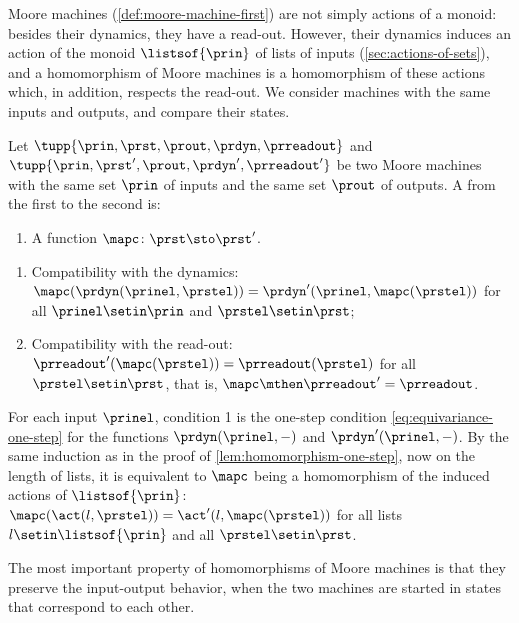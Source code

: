 Moore machines (\cref{def:moore-machine-first}) are not simply actions of a monoid: besides their dynamics, they have a read-out.
However, their dynamics induces an action of the monoid $\listsof{\prin}$ of lists of inputs (\cref{sec:actions-of-sets}), and a homomorphism of Moore machines is a homomorphism of these actions which, in addition, respects the read-out.
We consider machines with the same inputs and outputs, and compare their states.

\begin{ctdefinition}
    \label{def:moore-machine-homomorphism}
    Let $\tupp{\prin, \prst, \prout, \prdyn, \prreadout}$ and $\tupp{\prin, \prst', \prout, \prdyn', \prreadout'}$ be two Moore machines with the same set $\prin$ of inputs and the same set $\prout$ of outputs.
    A  from the first to the second is:

    \constit
    \begin{enumerate}
        \item A function $\mapc \colon \prst \sto \prst'$.
    \end{enumerate}

    \condit
    \begin{enumerate}
        \item Compatibility with the dynamics: $\mapc(\prdyn(\prinel, \prstel)) = \prdyn'(\prinel, \mapc(\prstel))$ for all $\prinel \setin \prin$ and $\prstel \setin \prst$;
        \item Compatibility with the read-out: $\prreadout'(\mapc(\prstel)) = \prreadout(\prstel)$ for all $\prstel \setin \prst$, that is, $\mapc \mthen \prreadout' = \prreadout$.
    \end{enumerate}
\end{ctdefinition}

For each input $\prinel$, condition 1 is the one-step condition \cref{eq:equivariance-one-step} for the functions $\prdyn(\prinel, -)$ and $\prdyn'(\prinel, -)$.
By the same induction as in the proof of \cref{lem:homomorphism-one-step}, now on the length of lists, it is equivalent to $\mapc$ being a homomorphism of the induced actions of $\listsof{\prin}$: $\mapc(\act(l, \prstel)) = \act'(l, \mapc(\prstel))$ for all lists $l \setin \listsof{\prin}$ and all $\prstel \setin \prst$.

The most important property of homomorphisms of Moore machines is that they preserve the input-output behavior, when the two machines are started in states that correspond to each other.

